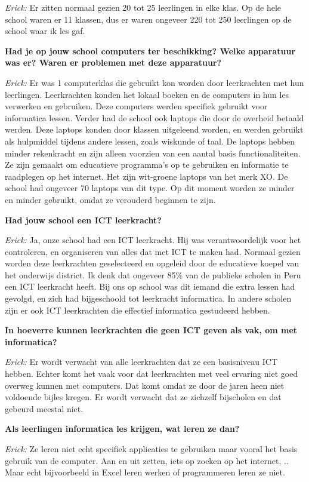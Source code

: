 \textit{Erick:} Er zitten normaal gezien 20 tot 25 leerlingen in elke klas. Op de hele school waren er 11 klassen, dus er waren ongeveer 220 tot 250 leerlingen op de school waar ik les gaf. %

\textbf{Had je op jouw school computers ter beschikking? Welke apparatuur was er? Waren er problemen met deze apparatuur?}

\textit{Erick:} Er was 1 computerklas die gebruikt kon worden door leerkrachten met hun leerlingen. Leerkrachten konden het lokaal boeken en de computers in hun les verwerken en gebruiken. Deze computers werden specifiek gebruikt voor informatica lessen. Verder had de school ook laptops die door de overheid betaald werden. Deze laptops konden door klassen uitgeleend worden, en werden gebruikt als hulpmiddel tijdens andere lessen, zoals wiskunde of taal. De laptops hebben minder rekenkracht en zijn alleen voorzien van een aantal basis functionaliteiten. Ze zijn gemaakt om educatieve programma's op te gebruiken en informatie te raadplegen op het internet. Het zijn wit-groene laptops van het merk XO. De school had ongeveer 70 laptops van dit type. Op dit moment worden ze minder en minder gebruikt, omdat ze verouderd beginnen te zijn.

\textbf{Had jouw school een ICT leerkracht?}

\textit{Erick:} Ja, onze school had een ICT leerkracht. Hij was verantwoordelijk voor het controleren, en organiseren van alles dat met ICT te maken had. Normaal gezien worden deze leerkrachten geselecteerd en opgeleid door de educatieve koepel van het onderwijs district. Ik denk dat ongeveer 85\% van de publieke scholen in Peru een ICT leerkracht heeft. Bij ons op school was dit iemand die extra lessen had gevolgd, en zich had bijgeschoold tot leerkracht informatica. In andere scholen zijn er ook ICT leerkrachten die effectief informatica gestudeerd hebben.

\textbf{In hoeverre kunnen leerkrachten die geen ICT geven als vak, om met informatica?}

\textit{Erick:} Er wordt verwacht van alle leerkrachten dat ze een basisniveau ICT hebben. Echter komt het vaak voor dat leerkrachten met veel ervaring niet goed overweg kunnen met computers. Dat komt omdat ze door de jaren heen niet voldoende bijles kregen. Er wordt verwacht dat ze zichzelf bijscholen en dat gebeurd meestal niet.

\textbf{Als leerlingen informatica les krijgen, wat leren ze dan?}

\textit{Erick:} Ze leren niet echt specifiek applicaties te gebruiken maar vooral het basis gebruik van de computer. Aan en uit zetten, iets op zoeken op het internet, .. Maar echt bijvoorbeeld in Excel leren werken of programmeren leren ze niet.

